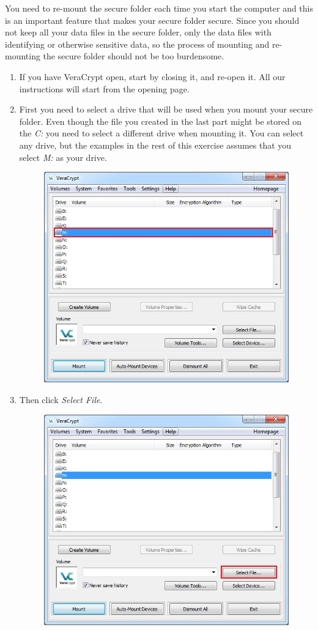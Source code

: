 \documentclass{tufte-handout}
\begin{document}
	You need to re-mount the secure folder each time you start the computer and this is an important feature that makes your secure folder secure. Since you should not keep all your data files in the secure folder, only the data files with identifying or otherwise sensitive data, so the process of mounting and re-mounting the secure folder should not be too burdensome.

\begin{enumerate}
	\item If you have VeraCrypt open, start by closing it, and re-open it. All our instructions will start from the opening page.
	
	\item First you need to select a drive that will be used when you mount your secure folder. Even though the file you created in the last part might be stored on the \textit{C:} you need to select a different drive when mounting it. You can select any drive, but the examples in the rest of this exercise assumes that you select \textit{M:} as your drive.
	\begin{figure}%
		\includegraphics[width=.8\linewidth]{img/vc_mount_1.png}
	\end{figure}
	\FloatBarrier
	
	\item Then click \textit{Select File}.
	\begin{figure}%
		\includegraphics[width=.8\linewidth]{img/vc_mount_2.png}
	\end{figure}
	\FloatBarrier	
	

\end{enumerate}
\end{document}
